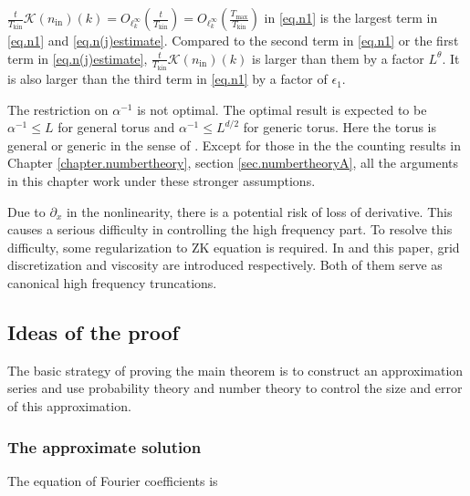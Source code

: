 \begin{rem}
$\frac{t}{T_{\mathrm{kin}}}\mathcal K(n_{\mathrm{in}})(k)=O_{\ell^\infty_k}\left(\frac{t}{T_{\mathrm{kin}}}\right)=O_{\ell^\infty_k}\left(\frac{T_{\mathrm{max}}}{T_{\mathrm{kin}}}\right)$ in \eqref{eq.n1} is the largest term in \eqref{eq.n1} and \eqref{eq.n(j)estimate}. Compared to the second term in \eqref{eq.n1} or the first term in \eqref{eq.n(j)estimate}, $\frac{t}{T_{\mathrm{kin}}}\mathcal K(n_{\mathrm{in}})(k)$ is larger than them by a factor $L^{\theta}$.  It is also larger than the third term in \eqref{eq.n1} by a factor of $\epsilon_1$.
\end{rem}

\begin{rem}
The restriction on $\alpha^{-1}$ is not optimal. The optimal result is expected to be $\alpha^{-1}\le L$ for general torus and $\alpha^{-1}\le L^{d/2}$ for generic torus. Here the torus is general or generic in the sense of \cite{deng2021derivation}. Except for those in the the counting results in Chapter \ref{chapter.numbertheory}, section \ref{sec.numbertheoryA}, all the arguments in this chapter work under these stronger assumptions.
\end{rem}

\begin{rem}
Due to $\partial_x$ in the nonlinearity, there is a potential risk of loss of derivative. This causes a serious difficulty in controlling the high frequency part. To resolve this difficulty, some regularization to ZK equation is required. In \cite{staffilani2021wave} and this paper, grid discretization and viscosity are introduced respectively. Both of them serve as canonical high frequency truncations.
\end{rem}




 





\subsection{Ideas of the proof} The basic strategy of proving the main theorem is to construct an approximation series and use probability theory and number theory to control the size and error of this approximation.


\subsubsection{The approximate solution}\label{sec.appsol} The equation of Fourier coefficients is

